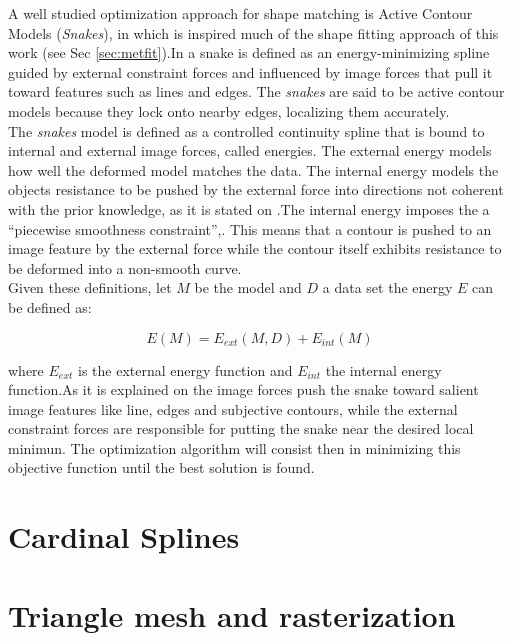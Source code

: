 A well studied optimization approach for shape matching is
Active Contour Models (\emph{Snakes}), in which is inspired much 
of the shape fitting approach of this work 
(see Sec \ref{sec:metfit}).In \cite{snakes} a snake is defined 
as an energy-minimizing spline guided by external constraint
forces and influenced by image forces that pull it toward 
features such as lines and edges. The \emph{snakes} are said to
be active contour models because they lock onto nearby edges,
localizing them accurately.\\
The \emph{snakes} model is defined as a controlled continuity spline that is bound
to internal and external image forces, called energies. The external energy models how well
the deformed model matches the data. The internal energy models
the objects resistance to be pushed by the external force into directions not coherent
with the prior knowledge, as it is stated on \cite{deformable}.The internal energy  imposes the 
a ``piecewise smoothness constraint'',\cite{snakes}. This means that a contour is
pushed to an image feature by the external force while the contour itself exhibits resistance
to be deformed into a non-smooth curve. \\

Given these definitions, let $M$ be the model and $D$ a data set
the energy $E$ can be defined as:

$$E(M) = E_{ext}(M,D) + E_{int}(M)$$

where $E_{ext}$ is the external energy function and $E_{int}$ the 
internal energy function.As it is explained on \cite{deformable} the image forces push the snake toward
salient image features like line, edges and subjective contours, while the external constraint forces
are responsible for putting the snake near the desired local minimun.
The optimization algorithm will consist then in minimizing this objective
function until the best solution is found.

\section{Cardinal Splines}
\label{sec:splines}

\section{Triangle mesh and rasterization}
\label{sec:triangle}



